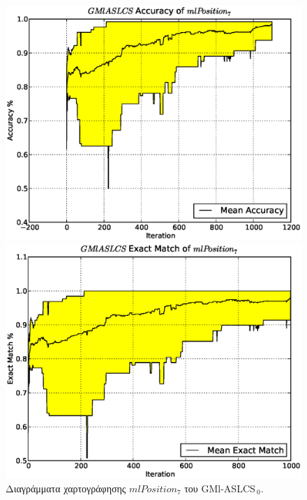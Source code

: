 \begin{figure}[ht]
  \caption{Διαγράμματα χαρτογράφησης $mlPosition_7$ του GMl-ASLCS$_{\:0}$.}
  \label{fig:gmlaslcs0Position7}
  \centering
  \includegraphics[scale=.49]{./images/artificial/gmlaslcs0/base/mlPosition7GMlASLCSacc.eps}
 
  \centering
  \includegraphics[scale=.49]{./images/artificial/gmlaslcs0/base/mlPosition7GMlASLCSex.eps}
  

\end{figure}
